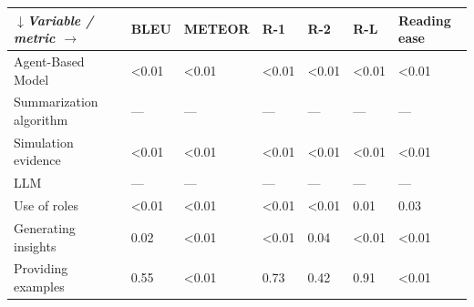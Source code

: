 \begin{tabular}{|l|l|l|l|l|l|l|}
\hline
\textit{$\downarrow$Variable / metric $\rightarrow$} & BLEU & METEOR & R-1 & R-2 & R-L & Reading ease \\
 \hline
 Agent-Based Model & \textless{}0.01 & \textless{}0.01 & \textless{}0.01 & \textless{}0.01 & \textless{}0.01 & \textless{}0.01 \\
 \hline
 Summarization algorithm & — & — & — & — & — & — \\
 \hline
 Simulation evidence & \textless{}0.01 & \textless{}0.01 & \textless{}0.01 & \textless{}0.01 & \textless{}0.01 & \textless{}0.01 \\
 \hline
 LLM & — & — & — & — & — & — \\
 \hline
 Use of roles & \textless{}0.01 & \textless{}0.01 & \textless{}0.01 & \textless{}0.01 & 0.01 & 0.03 \\
 \hline
 Generating insights & 0.02 & \textless{}0.01 & \textless{}0.01 & 0.04 & \textless{}0.01 & \textless{}0.01 \\
 \hline
 Providing examples & 0.55 & \textless{}0.01 & 0.73 & 0.42 & 0.91 & \textless{}0.01 \\
\hline
\end{tabular}
